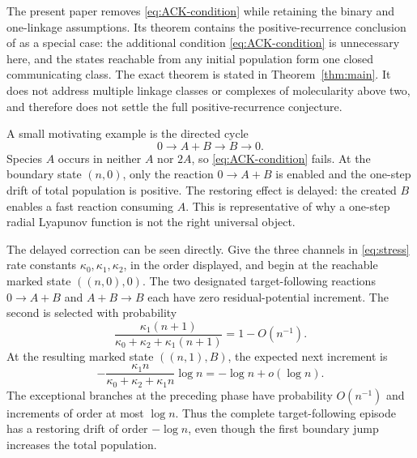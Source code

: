 The present paper removes \eqref{eq:ACK-condition} while retaining the binary
and one-linkage assumptions.  Its theorem contains the positive-recurrence
conclusion of \citet{AndersonCappellettiKim2020} as a special case: the
additional condition \eqref{eq:ACK-condition} is unnecessary here, and the
states reachable from any initial population form one closed communicating
class.  The exact theorem is stated in Theorem~\ref{thm:main}.  It does not
address multiple linkage classes or complexes of molecularity above two, and
therefore does not settle the full positive-recurrence conjecture.

A small motivating example is the directed cycle
\begin{equation}\label{eq:stress}
  0\longrightarrow A+B\longrightarrow B\longrightarrow0.
\end{equation}
Species \(A\) occurs in neither \(A\) nor \(2A\), so
\eqref{eq:ACK-condition} fails.  At the boundary state \((n,0)\), only the
reaction \(0\to A+B\) is enabled and the one-step drift of total population
is positive.  The restoring effect is delayed: the created \(B\) enables a
fast reaction consuming \(A\).  This is representative of why a one-step
radial Lyapunov function is not the right universal object.

The delayed correction can be seen directly.  Give the three channels in
\eqref{eq:stress} rate constants \(\kappa_0,\kappa_1,\kappa_2\), in the order
displayed, and begin at the reachable marked state \(((n,0),0)\).  The two
designated target-following reactions \(0\to A+B\) and \(A+B\to B\) each
have zero residual-potential increment.  The second is selected with
probability
\[
 \frac{\kappa_1(n+1)}{\kappa_0+\kappa_2+\kappa_1(n+1)}=1-O(n^{-1}).
\]
At the resulting marked state \(((n,1),B)\), the expected next increment is
\begin{equation}\label{eq:stress-drift}
 -\frac{\kappa_1n}{\kappa_0+\kappa_2+\kappa_1n}\log n
 =-\log n+o(\log n).
\end{equation}
The exceptional branches at the preceding phase have probability
\(O(n^{-1})\) and increments of order at most \(\log n\).  Thus the complete
target-following episode has a restoring drift of order \(-\log n\), even
though the first boundary jump increases the total population.

